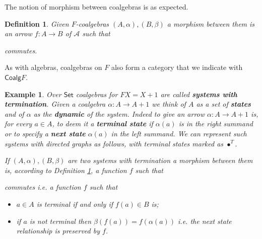 \documentclass[letterpaper, 11pt, oneside]{memoir}
\theoremstyle{myteo}
\newtheorem{definition}[theorem]{Definition}
\newtheorem{example}[theorem]{Example}
\numberwithin{equation}{section}
\newcommand{\marginnote}[1]{\marginpar{\footnotesize #1}}
\newcommand{\id}{\textsf{id}}
\newcommand{\Coalg}{\textsf{Coalg}}
\newcommand{\Set}{\textsf{Set}}
\newcommand{\A}{\mathscr{A}}
\begin{document}
The notion of morphism between coalgebras is as expected.

\begin{definition}
  \label{def:coalgebra-morphism}
  Given \(F\)-coalgebras \((A, \alpha), (B, \beta)\) a morphism between them is an arrow \(f : A \to B\) of \(\A\) such that
  \begin{center}
  \end{center}
  commutes.
\end{definition}

As with algebras, coalgebras on \(F\) also form a category that we indicate with \(\Coalg F\)\marginnote{\(\Coalg F\)}.

\begin{example}
  \label{ex:systems-with-termination}
  Over \(\Set\) coalgebras for \(FX = X + 1\) are called \textbf{systems with termination}\marginnote{systems with termination}.
  Given a coalgebra \(\alpha: A \to A + 1\) we think of \(A\) as a set of \textbf{states} and of \(\alpha\) as the \textbf{dynamic} of the system.
  Indeed to give an arrow \(\alpha:A \to A+1\) is, for every \(a \in A\), to deem it a \textbf{terminal state} if \(\alpha(a)\) is in the right summand or to specify a \textbf{next state} \(\alpha(a)\) in the left summand.
  We can represent such systems with directed graphs as follows, with terminal states marked as \(\bullet^T\).
  \begin{center}
  \end{center}
  If \((A, \alpha), (B, \beta)\) are two systems with termination a morphism between them is, according to Definition \ref{def:coalgebra-morphism}, a function \(f\) such that
  \begin{center}
  \end{center}
  commutes i.e. a function \(f\) such that
  \begin{itemize}
  \item[1.] \(a \in A\) is terminal if and only if \(f(a) \in B\) is;
  \item[2.] if \(a\) is not terminal then \(\beta(f(a)) = f(\alpha(a))\) i.e. the next state relationship is preserved by \(f\).
  \end{itemize}
\end{example}
\end{document}
